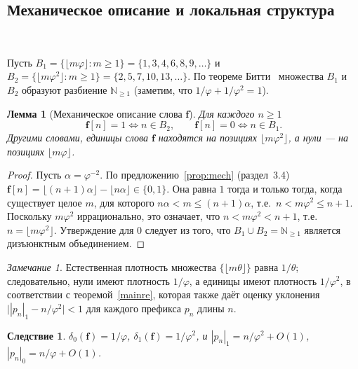 \documentclass[a4paper,14pt]{extreport}
\theoremstyle{plain}
\newtheorem{lemma}{Лемма}[section]
\newtheorem{corollary}[theorem]{Следствие}
\theoremstyle{definition}
\theoremstyle{remark}
\newtheorem{remark}{Замечание}
\begin{document}
\subsection{Механическое описание и локальная структура}\label{sec:main}~\label{sec3.5.2}

Пусть $B_1=\{\lfloor m\varphi\rfloor : m\ge1\}=\{1,3,4,6,8,9,\dots\}$ и
$B_2=\{\lfloor m\varphi^2\rfloor : m\ge1\}=\{2,5,7,10,13,\dots\}$. По теореме Битти~\cite{Beatty1926}
множества $B_1$ и $B_2$ образуют разбиение $\mathbb N_{\ge1}$ (заметим, что $1/\varphi+1/\varphi^2=1$).

\begin{lemma}[Механическое описание слова $\mathbf f$]\label{lem:mechanical}
	Для каждого $n\ge1$
	\begin{equation}
		\mathbf f[n]=1\iff n\in B_2,\qquad \mathbf f[n]=0\iff n\in B_1 .
	\end{equation}
	Другими словами, единицы слова $\mathbf f$ находятся на позициях $\lfloor m\varphi^2\rfloor$, а нули --- на позициях $\lfloor m\varphi\rfloor$.
\end{lemma}

\begin{proof}
	Пусть $\alpha=\varphi^{-2}$. По предложению~\ref{prop:mech} (раздел~3.4) $\mathbf f[n]=\lfloor (n+1)\alpha\rfloor-\lfloor n\alpha\rfloor\in\{0,1\}$.
	Она равна $1$ тогда и только тогда, когда существует целое $m$, для которого $n\alpha<m\le(n+1)\alpha$, т.е.\ $n<m\varphi^{2}\le n+1$.
	Поскольку $m\varphi^2$ иррационально, это означает, что $n<m\varphi^2<n+1$, т.е.\ $n=\lfloor m\varphi^2\rfloor$.
	Утверждение для $0$ следует из того, что $B_1\cup B_2=\mathbb N_{\ge1}$ является дизъюнктным объединением.
\end{proof}

\begin{remark}
	Естественная плотность множества $\{\lfloor m\theta\rfloor\}$ равна $1/\theta$; следовательно, нули имеют плотность $1/\varphi$, а единицы имеют плотность
	$1/\varphi^{2}$, в соответствии с теоремой~\ref{mainre}, которая также даёт оценку уклонения
	$\bigl||p_n|_1-n/\varphi^{2}\bigr|<1$ для каждого префикса $p_n$ длины $n$.
\end{remark}

\begin{corollary}\label{thm:density}\label{thm:prefix-density}\label{thm:summary-density}
	$\delta_0(\mathbf f)=1/\varphi$, $\delta_1(\mathbf f)=1/\varphi^{2}$, и $|p_n|_1=n/\varphi^{2}+O(1)$,
	$|p_n|_0=n/\varphi+O(1)$.
\end{corollary}
\end{document}
